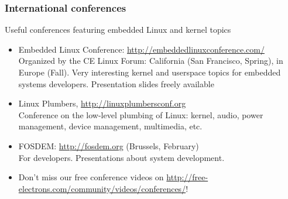 \begin{frame}
  \frametitle{International conferences}
  Useful conferences featuring embedded Linux and kernel topics
  \begin{itemize}
  \item Embedded Linux Conference: \url{http://embeddedlinuxconference.com/}\\
    Organized by the CE Linux Forum: California (San Francisco,
    Spring), in Europe (Fall).  Very interesting kernel and userspace
    topics for embedded systems developers.  Presentation slides
    freely available
  \item Linux Plumbers, \url{http://linuxplumbersconf.org}\\
    Conference on the low-level plumbing of Linux: kernel, audio,
    power management, device management, multimedia, etc.
  \item FOSDEM: \url{http://fosdem.org} (Brussels, February)\\
    For developers. Presentations about system development.
  \item Don't miss our free conference videos on
    \url{http://free-electrons.com/community/videos/conferences/}!
  \end{itemize}
\end{frame}

